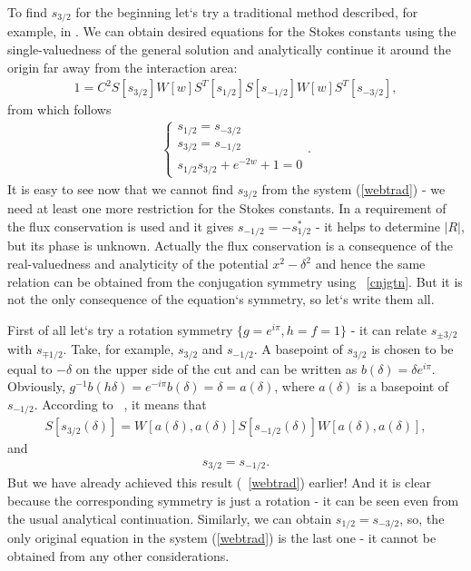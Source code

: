\documentclass[12pt]{iopart}
\begin{document}
To find $s_{3/2}$ for the beginning let`s try a traditional method described, for example, in \cite{white}. We can obtain desired equations for the Stokes constants using the single-valuedness of the general solution and analytically continue it around the origin far away from the interaction area:
\begin{eqnarray}
1 = C^2S[s_{3/2}]W[w]S^T[s_{1/2}]S[s_{-1/2}]W[w]S^T[s_{-3/2}],
\label{wgac}
\end{eqnarray}
from which follows
\begin{eqnarray}
\begin{cases} 
s_{1/2} = s_{-3/2}\\
s_{3/2} = s_{-1/2}\\ 
s_{1/2}s_{3/2} + e^{-2w} + 1 = 0
\end{cases}.
\label{webtrad}  
\end{eqnarray}
It is easy to see now that we cannot find $s_{3/2}$ from the system (\ref{webtrad}) - we need at least one more restriction for the Stokes constants. In \cite{white} a requirement of the flux conservation is used and it gives $s_{-1/2}=-s_{1/2}^*$ - it helps to determine $|R|$, but its phase is unknown. Actually the flux conservation is a consequence of the real-valuedness and analyticity of the potential $x^2-\delta^2$ and hence the same relation can be obtained from the conjugation symmetry using ~\ref{cnjgtn}. But it is not the only consequence of the equation`s symmetry, so let`s write them all.

First of all let`s try a rotation symmetry $\{g=e^{i\pi},h=f=1\}$ - it can relate $s_{\pm 3/2}$ with $s_{\mp 1/2}$. Take, for example, $s_{3/2}$ and $s_{-1/2}$. A basepoint of $s_{3/2}$ is chosen to be equal to $-\delta$ on the upper side of the cut and can be written as $b(\delta)=\delta e^{i\pi}$. Obviously, $g^{-1}b(h\delta)=e^{-i\pi}b(\delta)=\delta=a(\delta)$, where $a(\delta)$ is a basepoint of $s_{-1/2}$. According to ~, it means that
\begin{eqnarray}
S[s_{3/2}(\delta)] = W[a(\delta),a(\delta)]S[s_{-1/2}(\delta)]W[a(\delta),a(\delta)],
\label{webrs1}
\end{eqnarray}
and
\begin{eqnarray}
s_{3/2} = s_{-1/2}.
\label{webrel1}
\end{eqnarray}
But we have already achieved this result (~\ref{webtrad}) earlier! And it is clear because the corresponding symmetry is just a rotation - it can be seen even from the usual analytical continuation. Similarly, we can obtain $s_{1/2}=s_{-3/2}$, so, the only original equation in the system (\ref{webtrad}) is the last one - it cannot be obtained from any other considerations.
\end{document}
